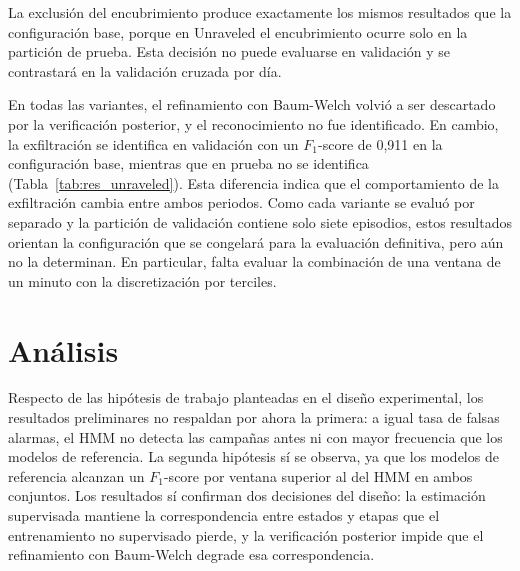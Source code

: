 La exclusión del encubrimiento produce exactamente los mismos resultados que la configuración base, porque en Unraveled el encubrimiento ocurre solo en la partición de prueba. Esta decisión no puede evaluarse en validación y se contrastará en la validación cruzada por día.

En todas las variantes, el refinamiento con Baum-Welch volvió a ser descartado por la verificación posterior, y el reconocimiento no fue identificado. En cambio, la exfiltración se identifica en validación con un $F_1$-score de 0,911 en la configuración base, mientras que en prueba no se identifica (Tabla~\ref{tab:res_unraveled}). Esta diferencia indica que el comportamiento de la exfiltración cambia entre ambos periodos. Como cada variante se evaluó por separado y la partición de validación contiene solo siete episodios, estos resultados orientan la configuración que se congelará para la evaluación definitiva, pero aún no la determinan. En particular, falta evaluar la combinación de una ventana de un minuto con la discretización por terciles.

\section{Análisis}
\label{sec:analisis_preliminar}
Respecto de las hipótesis de trabajo planteadas en el diseño experimental, los resultados preliminares no respaldan por ahora la primera: a igual tasa de falsas alarmas, el HMM no detecta las campañas antes ni con mayor frecuencia que los modelos de referencia. La segunda hipótesis sí se observa, ya que los modelos de referencia alcanzan un $F_1$-score por ventana superior al del HMM en ambos conjuntos. Los resultados sí confirman dos decisiones del diseño: la estimación supervisada mantiene la correspondencia entre estados y etapas que el entrenamiento no supervisado pierde, y la verificación posterior impide que el refinamiento con Baum-Welch degrade esa correspondencia.

